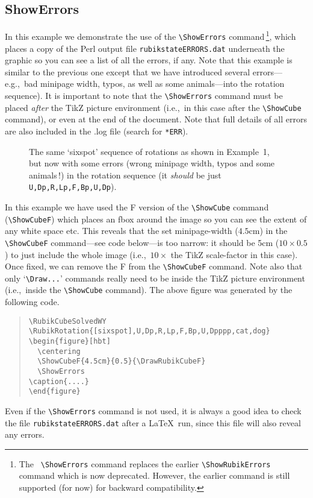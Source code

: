 \documentclass[a4paper]{article}
\begin{document}
\pagebreak

\subsection{ShowErrors}

 In this example we demonstrate  the use of the  \verb!\ShowErrors! 
 command\,\footnote{  The \texttt{ {\textbackslash}ShowErrors} command 
 replaces the earlier \texttt{{\textbackslash}ShowRubikErrors} command 
 which is now deprecated. However, the earlier command is still
 supported (for now) for backward compatibility.}, 
 which  places a copy of  the Perl output file \verb!rubikstateERRORS.dat! 
 underneath the graphic so you can see a list of all the  errors, if any. 
 Note that this example is similar to the previous one except that we have  
 introduced several  errors---e.g.,~bad minipage width,  typos, as well as 
 some animals---into  the rotation sequence). 
 It is important to note that  the  \verb!\ShowErrors! command must be 
 placed \textit{after}  the TikZ picture environment (i.e.,~in this case after 
the \verb!\ShowCube! command), or even at the end of the document. 
Note that full details of all errors are also included in the .log file (search for \texttt{*ERR}). 

%
\RubikCubeSolvedWY
{}
\begin{figure}[hbt]
\centering
{}
\ShowErrors
\parbox{0.8\textwidth}{%
\caption{\label{fig:sixspotE}The same `sixspot' sequence of rotations as shown 
in Example~1,  but now with some   errors (wrong minipage width, typos and some 
animals\,!) in the rotation sequence (it \textit{should} be just 
\texttt{U,Dp,R,Lp,F,Bp,U,Dp}).}}
\end{figure}
%
{\noindent}In this example we have used the F version of the \verb!\ShowCube! 
command (\verb!\ShowCubeF!)  which places an fbox around the image so you can see the 
extent of any white space etc. This reveals that the set minipage-width ($4.5$cm) in 
the \verb!\ShowCubeF! command---see code below---is too narrow: it should be 
5cm ($10 \times 0.5$) to just include the whole image (i.e.,~$10 \times$ the TikZ 
scale-factor in this case). 
Once fixed, we can remove the F from the \verb!\ShowCubeF! command.
Note also  that only `\verb!\Draw...!' commands really need to be inside the TikZ 
picture environment (i.e.,~inside the \verb!\ShowCube! command). The above figure 
was generated by the following code.
\begin{quote}
\begin{verbatim}
\RubikCubeSolvedWY
\RubikRotation{[sixspot],U,Dp,R,Lp,F,Bp,U,Dpppp,cat,dog}
\begin{figure}[hbt]
  \centering
  \ShowCubeF{4.5cm}{0.5}{\DrawRubikCubeF}
  \ShowErrors
\caption{....}
\end{figure}
\end{verbatim}
\end{quote}
Even if the \verb!\ShowErrors! command is not used, it is always a good idea 
to check the file \verb!rubikstateERRORS.dat! after a \LaTeX\ run, since this 
file will also reveal any  errors.
\end{document}
